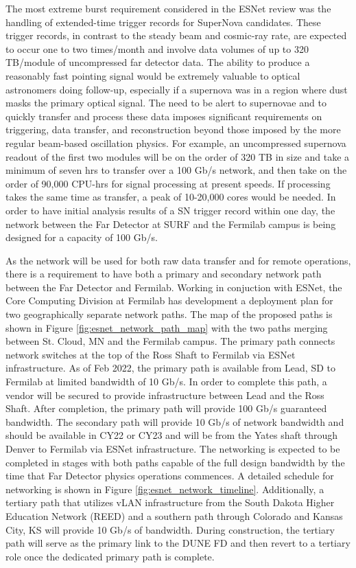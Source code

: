 \documentclass[../main-v1.tex]{subfiles}
\begin{document}
The most extreme burst requirement considered in the ESNet review was the handling of extended-time trigger records for SuperNova candidates. These trigger records, in contrast to the steady beam and cosmic-ray rate,
are expected to occur one to two times/month and involve data volumes of up to 320 TB/module of uncompressed far detector data. The ability to produce a reasonably fast pointing signal would be extremely valuable to optical astronomers doing follow-up, especially if a supernova was in a region where dust masks the primary optical signal. The need to be alert to supernovae and to quickly transfer and process these data imposes significant requirements on triggering, data transfer, and reconstruction beyond those imposed by the more regular beam-based oscillation physics. For example, an uncompressed supernova readout of the first two modules will be on the order of 320 TB in size and take a minimum of seven hrs to transfer over a 100 Gb/s network, and then take on the order of 90,000 CPU-hrs for signal processing at present speeds. If processing takes the same time as transfer, a peak of 10-20,000 cores would be needed. In order to have initial analysis results of a SN trigger record within one day, the network between the Far Detector at SURF and the Fermilab campus is being designed for a capacity of 100 Gb/s.  


As the network will be used for both raw data transfer and for remote operations, there is a requirement to have both a primary and secondary network path between the Far Detector and Fermilab. Working in conjuction with ESNet, the Core Computing Division at Fermilab has development a deployment plan for two geographically separate network paths. The map of the proposed paths is shown in Figure \ref{fig:esnet_network_path_map} with the two paths merging between St. Cloud, MN and the Fermilab campus. The primary path connects network switches at the top of the Ross Shaft to Fermilab via ESNet infrastructure. As of Feb 2022, the primary path is available from Lead, SD to Fermilab at limited bandwidth of 10 Gb/s. In order to complete this path, a vendor will be secured to provide infrastructure between Lead and the Ross Shaft. After completion, the primary path will provide 100 Gb/s guaranteed bandwidth. The secondary path will provide 10 Gb/s of network bandwidth and should be available in CY22 or CY23 and will be from the Yates shaft through Denver to Fermilab via ESNet infrastructure. The networking is expected to be completed in stages with both paths capable of the full design bandwidth by the time that Far Detector physics operations commences. A detailed schedule for networking is shown in Figure \ref{fig:esnet_network_timeline}. Additionally, a tertiary path that utilizes vLAN infrastructure from the South Dakota Higher Education Network (REED) and a southern path through Colorado and Kansas City, KS will provide 10 Gb/s of bandwidth. During construction, the tertiary path will serve as the primary link to the DUNE FD and then revert to a tertiary role once the dedicated primary path is complete.
\end{document}
